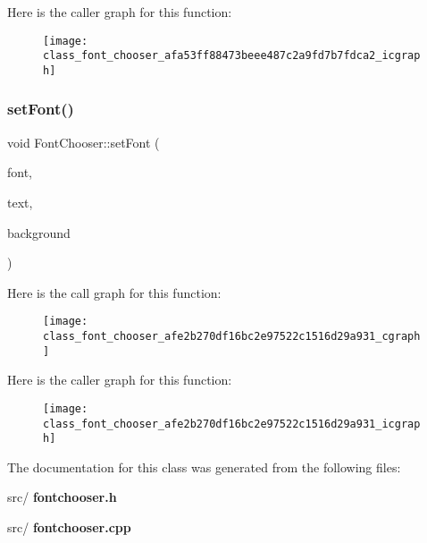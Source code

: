 Here is the caller graph for this function\+:\nopagebreak
\begin{figure}[H]
\begin{center}
\leavevmode
\texttt{[image: class\_font\_chooser\_afa53ff88473beee487c2a9fd7b7fdca2\_icgraph]}
\end{center}
\end{figure}
\mbox{\label{class_font_chooser_afe2b270df16bc2e97522c1516d29a931}} 
\subsubsection{set\+Font()}
{\footnotesize\ttfamily void Font\+Chooser\+::set\+Font (\begin{DoxyParamCaption}\item[{Q\+Font}]{font,  }\item[{Q\+Color}]{text,  }\item[{Q\+Color}]{background }\end{DoxyParamCaption})}

Here is the call graph for this function\+:\nopagebreak
\begin{figure}[H]
\begin{center}
\leavevmode
\texttt{[image: class\_font\_chooser\_afe2b270df16bc2e97522c1516d29a931\_cgraph]}
\end{center}
\end{figure}
Here is the caller graph for this function\+:\nopagebreak
\begin{figure}[H]
\begin{center}
\leavevmode
\texttt{[image: class\_font\_chooser\_afe2b270df16bc2e97522c1516d29a931\_icgraph]}
\end{center}
\end{figure}


The documentation for this class was generated from the following files\+:\begin{DoxyCompactItemize}
\item 
src/\textbf{ fontchooser.\+h}\item 
src/\textbf{ fontchooser.\+cpp}\end{DoxyCompactItemize}
